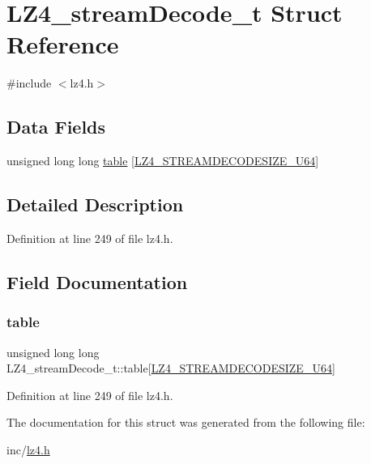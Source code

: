 \hypertarget{structLZ4__streamDecode__t}{}\section{L\+Z4\+\_\+stream\+Decode\+\_\+t Struct Reference}
\label{structLZ4__streamDecode__t}


{\ttfamily \#include $<$lz4.\+h$>$}

\subsection*{Data Fields}
\begin{DoxyCompactItemize}
\item 
unsigned long long \hyperlink{structLZ4__streamDecode__t_a66753ac76e6b36336f3d4f3fb4714885}{table} \mbox{[}\hyperlink{lz4_8h_a414ecb38e0607f239de5ebca5a5beef5}{L\+Z4\+\_\+\+S\+T\+R\+E\+A\+M\+D\+E\+C\+O\+D\+E\+S\+I\+Z\+E\+\_\+\+U64}\mbox{]}
\end{DoxyCompactItemize}


\subsection{Detailed Description}


Definition at line 249 of file lz4.\+h.



\subsection{Field Documentation}
\mbox{\label{structLZ4__streamDecode__t_a66753ac76e6b36336f3d4f3fb4714885}} 
\subsubsection{\texorpdfstring{table}{table}}
{\footnotesize\ttfamily unsigned long long L\+Z4\+\_\+stream\+Decode\+\_\+t\+::table\mbox{[}\hyperlink{lz4_8h_a414ecb38e0607f239de5ebca5a5beef5}{L\+Z4\+\_\+\+S\+T\+R\+E\+A\+M\+D\+E\+C\+O\+D\+E\+S\+I\+Z\+E\+\_\+\+U64}\mbox{]}}



Definition at line 249 of file lz4.\+h.



The documentation for this struct was generated from the following file\+:\begin{DoxyCompactItemize}
\item 
inc/\hyperlink{lz4_8h}{lz4.\+h}\end{DoxyCompactItemize}
